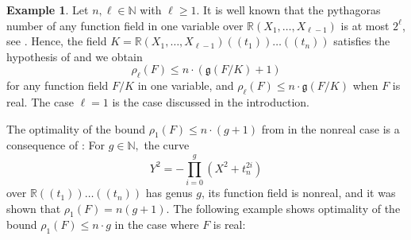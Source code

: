 \documentclass[a4paper,12pt,reqno]{amsart}
\theoremstyle{definition}
\newtheorem{ex}[thm]{Example}
\numberwithin{equation}{thm}
\renewcommand{\leq}{\leqslant}
\renewcommand{\geq}{\geqslant}
\begin{document}
\begin{ex}\label{mainsostheoremapplied} Let $n,\ell\in\mathbb{N}$ with $\ell \geq 1.$ It is well known that the pythagoras number of any function field in one variable over $\mathbb{R}(X_{1},\ldots,X_{\ell-1})$ is at most $2^\ell$,  see \cite[Example 1.4 (4), chap. 7]{Pf95}. Hence, the field $K=\mathbb{R}(X_{1},\ldots,X_{\ell-1})(\!(t_{1})\!)\ldots(\!(t_{n})\!)$ satisfies the hypothesis of  and we obtain 
$$\rho_{\ell}(F)\leq n\cdot (\mathfrak{g}(F/K)+1)$$ for any function field $F/K$ in one variable, and 
$\rho_{\ell}(F)\leq n \cdot \mathfrak{g}(F/K)$ when $F$ is real. The case $\ell=1$ is the case discussed in the introduction.
\end{ex}




The optimality of the bound $\rho_1(F) \leq n\cdot (g+1)$ from  in the nonreal case is a consequence of \cite[Example 4.5]{GM24}:  For $g\in\mathbb{N},$ the curve $$Y^{2}=-\prod_{i=0}^{g}(X^{2}+t_{n}^{2i})$$ over $\mathbb{R}(\!(t_{1})\!)\ldots(\!(t_{n})\!)$ has genus $g$, its function field is nonreal, and it was shown that $\rho_{1}(F)=n(g+1).$ The following example shows optimality of the bound $\rho_{1}(F) \leq n\cdot g$ in the case where $F$ is real: 
\end{document}
